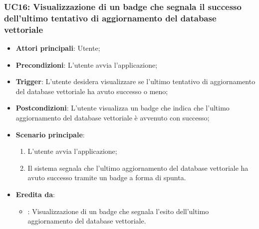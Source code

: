 \subsubsection{UC16: Visualizzazione di un badge che segnala il successo dell'ultimo tentativo di aggiornamento del database vettoriale}
\begin{itemize}
    \item \textbf{Attori principali}: Utente;
    \item \textbf{Precondizioni}: L'utente avvia l'applicazione;
    \item \textbf{Trigger}: L'utente desidera visualizzare se l'ultimo tentativo di aggiornamento del database vettoriale
    ha avuto successo o meno;
    \item \textbf{Postcondizioni}: L'utente visualizza un badge che indica che l'ultimo aggiornamento del database vettoriale
    è avvenuto con successo;
    \item \textbf{Scenario principale}:
    \begin{enumerate}
        \item L'utente avvia l'applicazione;
        \item Il sistema segnala che l'ultimo aggiornamento del database vettoriale ha avuto successo tramite un badge a forma di spunta.
    \end{enumerate}
    \item \textbf{Eredita da}:
    \begin{itemize}
        \item {}: Visualizzazione di un badge che segnala l'esito dell'ultimo aggiornamento del database vettoriale.
    \end{itemize}
\end{itemize}

\hypertarget{UC17}{}
